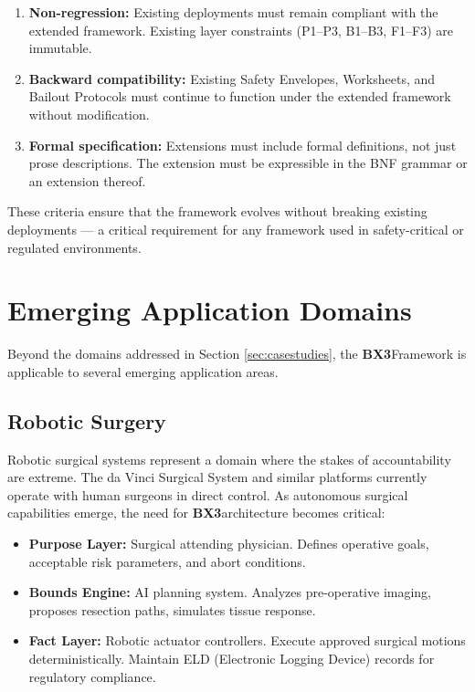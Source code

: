 \documentclass[12pt]{article}
\newcommand{\bxthree}{\textbf{BX3}}
\begin{document}
\begin{enumerate}
\item \textbf{Non-regression:} Existing deployments must remain compliant with the extended framework. Existing layer constraints (P1--P3, B1--B3, F1--F3) are immutable.
\item \textbf{Backward compatibility:} Existing Safety Envelopes, Worksheets, and Bailout Protocols must continue to function under the extended framework without modification.
\item \textbf{Formal specification:} Extensions must include formal definitions, not just prose descriptions. The extension must be expressible in the BNF grammar or an extension thereof.
\end{enumerate}

These criteria ensure that the framework evolves without breaking existing deployments — a critical requirement for any framework used in safety-critical or regulated environments.

\section{Emerging Application Domains}
\label{sec:emerging}

Beyond the domains addressed in Section \ref{sec:casestudies}, the \bxthree Framework is applicable to several emerging application areas.

\subsection{Robotic Surgery}
Robotic surgical systems represent a domain where the stakes of accountability are extreme. The da Vinci Surgical System and similar platforms currently operate with human surgeons in direct control. As autonomous surgical capabilities emerge, the need for \bxthree architecture becomes critical:

\begin{itemize}
\item \textbf{Purpose Layer:} Surgical attending physician. Defines operative goals, acceptable risk parameters, and abort conditions.
\item \textbf{Bounds Engine:} AI planning system. Analyzes pre-operative imaging, proposes resection paths, simulates tissue response.
\item \textbf{Fact Layer:} Robotic actuator controllers. Execute approved surgical motions deterministically. Maintain ELD (Electronic Logging Device) records for regulatory compliance.
\end{itemize}
\end{document}
